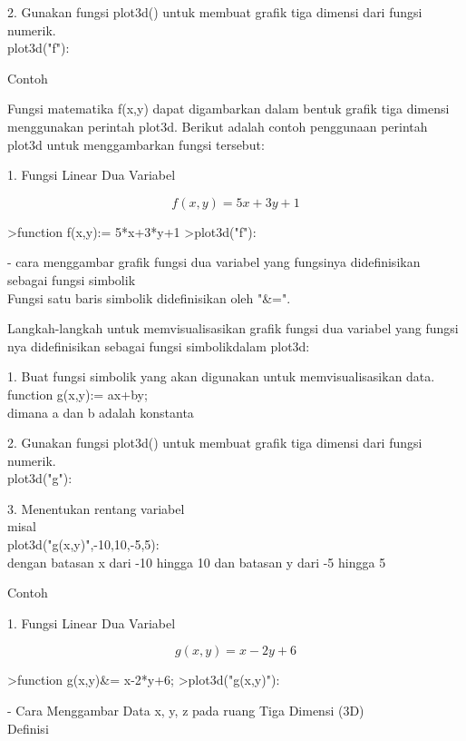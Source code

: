 \documentclass[a4paper,10pt]{article}
\begin{document}
\begin{eulernotebook}
\begin{eulercomment}
\begin{eulercomment}
\begin{eulercomment}
2. Gunakan fungsi plot3d() untuk membuat grafik tiga dimensi dari
fungsi numerik.\\
plot3d("f"):

Contoh

Fungsi matematika f(x,y) dapat digambarkan dalam bentuk grafik tiga
dimensi menggunakan perintah plot3d. Berikut adalah contoh penggunaan
perintah plot3d untuk menggambarkan fungsi tersebut:

1. Fungsi Linear Dua Variabel

\end{eulercomment}
\begin{eulerformula}
\[
f(x,y)=5x+3y+1
\]
\end{eulerformula}
\begin{eulerprompt}
>function f(x,y):= 5*x+3*y+1
>plot3d("f"):
\end{eulerprompt}
\begin{eulercomment}
- cara menggambar grafik fungsi dua variabel yang fungsinya
didefinisikan sebagai fungsi simbolik\\
Fungsi satu baris simbolik didefinisikan oleh "\&=".

Langkah-langkah untuk memvisualisasikan grafik fungsi dua variabel
yang fungsi nya didefinisikan sebagai fungsi simbolikdalam plot3d:

1. Buat fungsi simbolik yang akan digunakan untuk memvisualisasikan
data.\\
function g(x,y):= ax+by;\\
dimana a dan b adalah konstanta

2. Gunakan fungsi plot3d() untuk membuat grafik tiga dimensi dari
fungsi numerik.\\
plot3d("g"):

3. Menentukan rentang variabel\\
misal\\
plot3d("g(x,y)",-10,10,-5,5):\\
dengan batasan x dari -10 hingga 10 dan batasan y dari -5 hingga 5

Contoh

1. Fungsi Linear Dua Variabel

\end{eulercomment}
\begin{eulerformula}
\[
g(x,y)=x-2y+6
\]
\end{eulerformula}
\begin{eulerprompt}
>function g(x,y)&= x-2*y+6;
>plot3d("g(x,y)"):
\end{eulerprompt}
\begin{eulercomment}
- Cara Menggambar Data \textdollar{}x\textdollar{}, \textdollar{}y\textdollar{}, \textdollar{}z\textdollar{} pada ruang Tiga Dimensi (3D)\\
Definisi


\end{eulercomment}
\end{eulercomment}
\end{eulercomment}
\end{eulernotebook}
\end{document}
